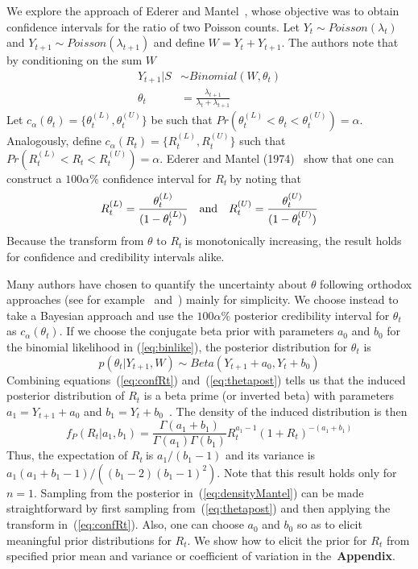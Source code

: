 \documentclass[10pt]{article}
\def \rr {$R_{t}\:$}
\begin{document}
We explore the approach of Ederer and Mantel~\citep{mantel}, whose objective 
was  to obtain confidence intervals for the ratio of two Poisson counts. 
Let $Y_{t} \sim Poisson(\lambda_t)$ and $Y_{t+1} \sim Poisson(\lambda_{t+1})$ 
and define $W = Y_{t} + Y_{t+1}$.
The authors note that by conditioning on the sum $W$
\begin{align}
\label{eq:binlike}
Y_{t+1} | S &\sim Binomial(W, \theta_t) \\
\theta_t &= \frac{\lambda_{t+1}}{\lambda_{t} + \lambda_{t+1}}
\end{align}
Let $c_{\alpha}(\theta_t) = \{\theta_t^{(L)} , \theta_t^{(U)} \}$ be such that 
$Pr(\theta_t^{(L)}<\theta_t <\theta_t^{(U)}) = \alpha$.
Analogously, define $c_{\alpha}(R_t) = \{R_t^{(L)} , R_t^{(U)} \}$ such that 
$Pr(R_t^{(L)}<R_t<R_t^{(U)}) = \alpha$.
Ederer and Mantel (1974)~\citep{mantel} show that one can construct a 
$100\alpha 
\%$ confidence interval for \rr by noting that
\begin{equation}
\label{eq:confRt}
 R_t^{(L)} = \frac{\theta_t^{(L)}}{(1-\theta_t^{(L)})} \quad \text{and} \quad 
R_t^{(U)} = \frac{\theta_t^{(U)}}{(1-\theta_t^{(U)})}\\
\end{equation}
Because the transform from $\theta$ to \rr is monotonically 
increasing, the result holds for confidence and credibility intervals alike.

Many authors have chosen to quantify the uncertainty about $\theta$ 
following orthodox approaches  (see for example~\citep{wilson} 
and~\citep{clopper}) mainly for simplicity.
We choose instead to take a Bayesian approach and use the  $100\alpha \%$ 
posterior credibility interval for $\theta_t$ as $c_{\alpha}(\theta_t)$.
If we choose the conjugate beta prior with parameters $a_0$ and $b_0$ for the 
binomial likelihood in (\ref{eq:binlike}), the posterior distribution for 
$\theta_t$ is
\begin{equation}
\label{eq:thetapost}
p(\theta_t| Y_{t+1}, W) \sim Beta(Y_{t+1} + a_0, Y_t + b_0)
\end{equation}
Combining equations~(\ref{eq:confRt}) and~(\ref{eq:thetapost}) 
tells us that the induced posterior distribution of $R_t$ is 
a beta prime (or inverted beta) with parameters $a_1 = Y_{t+1} + a_0$ and $b_1 
=  Y_t + b_0$~\citep{dubey1970}.
The density of the induced distribution is then 
\begin{equation}
\label{eq:densityMantel}
f_P(R_t| a_1, b_1) = \frac{\Gamma(a_1 + b_1)}{\Gamma(a_1)\Gamma(b_1)} R_t^{a_1 
- 
1} (1 + R_t)^{-(a_1 + b_1)}
\end{equation}
Thus, the expectation of \rr is $a_1/(b_1 - 1)$ and its variance is 
$a_1(a_1 + b_1 - 1)/\left((b_1 - 2)(b_1 - 1)^2 \right) $.
Note that this result holds only for $n = 1$.
Sampling from the posterior in~(\ref{eq:densityMantel}) can be made 
straightforward by first sampling from~(\ref{eq:thetapost}) and then applying 
the transform in~(\ref{eq:confRt}).
Also, one can choose $a_0$ and $b_0$ so as to elicit meaningful prior 
distributions for $R_t$.
We show how to elicit the prior for $R_t$ from specified prior mean and variance
or coefficient of variation in the~\textbf{Appendix}.
\end{document}
